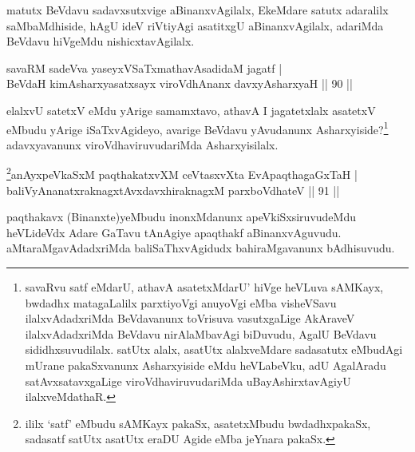 \begin{artha}
matutx BeVdavu sadavxsutxvige aBinanxvAgilalx, EkeMdare satutx adaralilx saMbaMdhiside, hAgU ideV riVtiyAgi asatitxgU aBinanxvAgilalx, adariMda BeVdavu hiVgeMdu nishicxtavAgilalx.
\end{artha}



\begin{shl}
savaRM sadeVva yaseyxVSaTxmathavA\s  sadidaM jagatf  | \\
BeVdaH kimAsharxyasatxsayx viroVdhAnanx davxyAsharxyaH \hfill||  90 ||  
\end{shl}

\begin{artha}
elalxvU satetxV eMdu yArige samamxtavo, athavA I jagatetxlalx asatetxV eMbudu yArige iSaTxvAgideyo, avarige BeVdavu yAvudanunx Asharxyiside?\footnote{savaRvu satf eMdarU, athavA asatetxMdarU' hiVge heVLuva sAMKayx, bwdadhx matagaLalilx parxtiyoVgi anuyoVgi eMba visheVSavu ilalxvAdadxriMda BeVdavanunx toVrisuva vasutxgaLige AkAraveV ilalxvAdadxriMda BeVdavu nirAlaMbavAgi biDuvudu, AgalU BeVdavu sididhxsuvudilalx. satUtx alalx, asatUtx alalxveMdare sadasatutx eMbudAgi mUrane pakaSxvanunx Asharxyiside eMdu heVLabeVku, adU AgalAradu satAvxsatavxgaLige viroVdhaviruvudariMda uBayAshirxtavAgiyU ilalxveMdathaR.} adavxyavanunx viroVdhaviruvudariMda Asharxyisilalx.
\end{artha}


\begin{shl}
\footnote{ ililx `satf' eMbudu sAMKayx pakaSx, asatetxMbudu bwdadhxpakaSx, sadasatf satUtx asatUtx eraDU Agide eMba jeYnara pakaSx.}anAyxpeVkaSxM paqthakatxvXM ceVtasxvXta EvApaqthagaGxTaH  | \\
baliVyAnanatxraknagxtAvxdavxhiraknagxM parxboVdhateV \hfill||  91 ||  
\end{shl}

\begin{artha}
paqthakavx (Binanxte)yeMbudu inonxMdanunx apeVkiSxsiruvudeMdu heVLideVdx Adare GaTavu tAnAgiye apaqthakf aBinanxvAguvudu. aMtaraMgavAdadxriMda baliSaThxvAgidudx bahiraMgavanunx bAdhisuvudu.
\end{artha}


